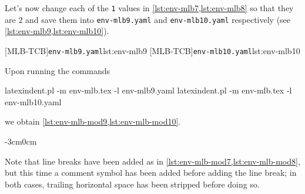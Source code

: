 \documentclass[10pt]{article}
\newenvironment{widepage}{\begin{adjustwidth}{-3cm}{0cm}}{\end{adjustwidth}}
\begin{document}
  \begin{example}
  Let's now change each of the \texttt{1} values in \cref{lst:env-mlb7,lst:env-mlb8} so
  that they are $2$ and save them into \texttt{env-mlb9.yaml} and \texttt{env-mlb10.yaml}
  respectively (see \cref{lst:env-mlb9,lst:env-mlb10}). 

  \begin{cmhtcbraster}
   [MLB-TCB]{\texttt{env-mlb9.yaml}}{lst:env-mlb9}
   [MLB-TCB]{\texttt{env-mlb10.yaml}}{lst:env-mlb10}
  \end{cmhtcbraster}

  Upon running the commands

  \begin{commandshell}
latexindent.pl -m env-mlb.tex -l env-mlb9.yaml
latexindent.pl -m env-mlb.tex -l env-mlb10.yaml
\end{commandshell}

  we obtain \cref{lst:env-mlb-mod9,lst:env-mlb-mod10}.

  \begin{widepage}
   \begin{minipage}{.43\linewidth}
   \end{minipage}
   \hfill
   \begin{minipage}{.56\linewidth}
   \end{minipage}
  \end{widepage}

  Note that line breaks have been added as in \cref{lst:env-mlb-mod7,lst:env-mlb-mod8},
  but this time a comment symbol has been added before adding the line break; in both
  cases, trailing horizontal space has been stripped before doing so.
  \end{example}
\end{document}
